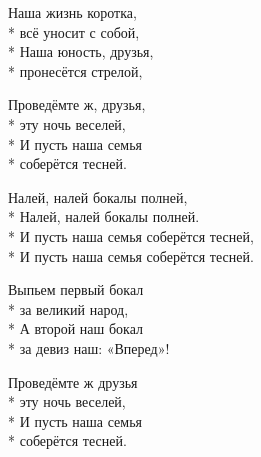\medskip

\begin{minipage}{\linewidth}
Наша жизнь коротка,\\*
всё уносит с собой,\\*
Наша юность, друзья,\\*
пронесётся стрелой,\\
\end{minipage}\par\medskip\nobreak

\medskip

\begin{minipage}{\linewidth}
Проведёмте ж, друзья,\\*
эту ночь веселей,\\*
И пусть наша семья\\*
соберётся тесней.\\
\end{minipage}\par\medskip\nobreak

\medskip

\begin{minipage}{\linewidth}
\hspace*{1.5em}Налей, налей бокалы полней,\\*
\hspace*{1.5em}Налей, налей бокалы полней.\\*
\hspace*{1.5em}И пусть наша семья соберётся тесней,\\*
\hspace*{1.5em}И пусть наша семья соберётся тесней.\\
\end{minipage}\par\medskip\nobreak

\medskip

\begin{minipage}{\linewidth}
Выпьем первый бокал\\*
за великий народ,\\*
А второй наш бокал\\*
за девиз наш: «Вперед»!\\
\end{minipage}\par\medskip\nobreak

\medskip

\begin{minipage}{\linewidth}
Проведёмте ж друзья\\*
эту ночь веселей,\\*
И пусть наша семья\\*
соберётся тесней.\\
\end{minipage}\par\medskip\nobreak

